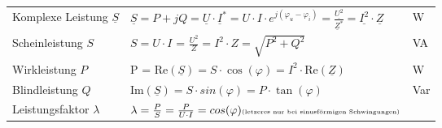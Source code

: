\medskip
\begin{tabularx}{\linewidth}{lXl}
	Komplexe Leistung $\underline{S}$ & $\underline{S} = P + jQ = \underline{U} \cdot \underline{I}^* = U \cdot I \cdot e^{j(\varphi_u - \varphi_i)} = \frac{\underline{U^2}}{\underline{Z}^*} = \underline{I^2} \cdot \underline{Z}$ & W   \\
	Scheinleistung $S$                & $S = U \cdot I$ = $\frac{U^2}{Z} = I^2 \cdot Z = \sqrt{P^2 + Q^2}$                                                                                                                            & VA  \\
	Wirkleistung $P$                  & P = $\text{Re}(\underline{S}) = S \cdot \cos(\varphi) = I^2 \cdot \text{Re}(\underline{Z})$                                                                                                   & W   \\
	Blindleistung $Q$                 & $\text{Im}(\underline{S}) = S \cdot sin(\varphi) = P \cdot \tan(\varphi)$                                                                                                                     & Var \\
	Leistungsfaktor $\lambda$         & $\lambda = \frac{P}{S} = \frac{P}{U \cdot I} = cos(\varphi) \text{\tiny (letzeres nur bei sinusförmigen Schwingungen)}$                                                                       &
\end{tabularx}
